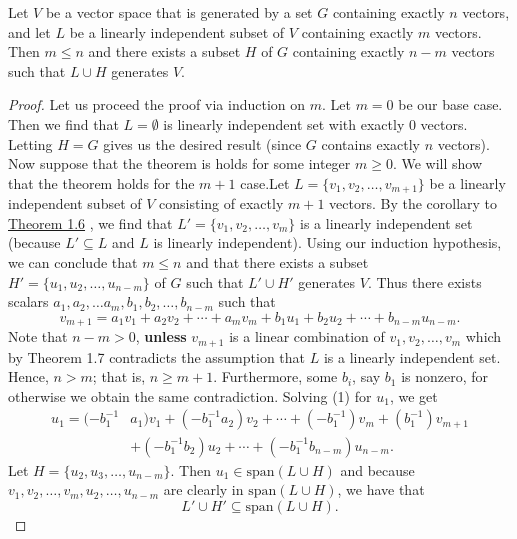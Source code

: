 \begin{theorem}\label{Replacement Theorem}
   Let \( V  \) be a vector space that is generated by a set \( G  \) containing exactly \( n  \) vectors, and let \( L  \) be a linearly independent subset of \( V  \) containing exactly \( m  \) vectors. Then \( m \leq n  \) and there exists a subset \( H  \) of \( G  \) containing exactly \( n - m  \) vectors such that \( L \cup H  \) generates \( V  \).  
\end{theorem}
\begin{proof}
Let us proceed the proof via induction on \( m  \). Let \( m = 0  \) be our base case. Then we find that \( L = \emptyset  \) is linearly independent set with exactly \( 0  \) vectors. Letting \( H = G   \) gives us the desired result (since \( G  \) contains exactly \( n  \) vectors).
    Now suppose that the theorem is holds for some integer \( m \geq 0  \). We will show that the theorem holds for the \( m + 1  \) case.Let \( L = \{ v_{1}, v_{2}, \dots, v_{m+1} \}  \) be a linearly independent subset of \( V  \) consisting of exactly \( m + 1  \) vectors. By the corollary to { \hyperref[Corollary to Theorem 1.6]{Theorem 1.6} }, we find that \(L' =  \{ v_{1}, v_{2}, \dots, v_{m} \}  \) is a linearly independent set (because \( L' \subseteq L  \) and \( L  \) is linearly independent). Using our induction hypothesis, we can conclude that \( m \leq n  \) and that there exists a subset \( H' =  \{ u_{1}, u_{2}, \dots, u_{n-m} \}  \) of \( G  \) such that \( L' \cup H' \) generates \( V  \). Thus there exists scalars \( a_{1}, a_{2}, \dots a_{m}, b_{1}, b_{2}, \dots, b_{n-m} \) such that  
    \[  v_{m+1} = a_{1} v_{1} + a_{2} v_{2} + \cdots +   a_{m} v_{m} + b_{1} u_{1} + b_{2} u_{2} + \cdots + b_{n-m} u_{n-m} \tag{1}.\] 
    Note that \( n -m > 0  \), \textbf{unless} \( v_{m+1} \) is a linear combination of \( v_{1}, v_{2}, \dots, v_{m} \) which by Theorem 1.7 contradicts the assumption that \( L  \) is a linearly independent set. Hence, \( n > m  \); that is, \( n \geq m + 1  \). Furthermore, some \( b_{i}  \), say \( b_{1}  \) is nonzero, for otherwise we obtain the same contradiction. Solving (1) for \( u_{1}  \), we get 
    \begin{align*}
        u_{1} =  (- b_{1}^{-1} &a_{1}) v_{1} + (- b_{1}^{-1} a_{2}) v_{2} + \cdots + (- b_{1}^{-1} ) v_{m} + (b_{1}^{-1} )v_{m+1}   \\
                               &+ (- b_{1}^{-1} b_{2} ) u_{2} + \cdots + (- b_{1}^{-1} b_{n-m}) u_{n-m}.
    \end{align*}
    Let \( H = \{  u_{2}, u_{3}, \dots, u_{n-m} \}  \). Then \( u_{1} \in \text{span}(L \cup H ) \) and because \( v_{1}, v_{2}, \dots, v_{m} , u_{2}, \dots, u_{n-m}\) are clearly in \( \text{span}(L \cup H ) \), we have that 
    \[ L' \cup H' \subseteq \text{span}(L \cup H).  \]
    

\end{proof}
